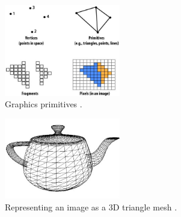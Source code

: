 \documentclass[12pt, twocolumn]{report}
\begin{document}
\begin{figure}[htbp]
    \centering
    \includegraphics[width=0.45\textwidth]{Figures/GPU graphics primitives.jpg}
    \caption{Graphics primitives \cite{GPU architecture lecture}.}
    \label{GPU graphics primitives}
\end{figure}

\begin{figure}[htbp]
    \centering
    \includegraphics[width=0.45\textwidth]{Figures/GPU graphics triangle mesh.jpg}
    \caption{Representing an image as a 3D triangle mesh \cite{GPU architecture lecture}.}
    \label{GPU graphics triangle mesh}
\end{figure}
\end{document}

